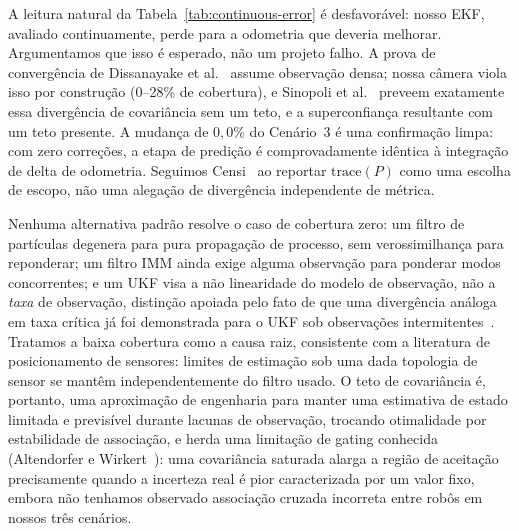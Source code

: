 \documentclass[runningheads]{llncs}
\renewcommand{\paragraph}[1]{\vspace{4pt}\noindent{\em #1}\enspace}
\begin{document}
\paragraph{Discussão.}
\label{sec:discussion}
A leitura natural da Tabela~\ref{tab:continuous-error} é desfavorável:
nosso EKF, avaliado continuamente, perde para a odometria que deveria
melhorar. Argumentamos que isso é esperado, não um projeto falho. A
prova de convergência de Dissanayake et
al.~\cite{dissanayake2001slam} assume observação densa; nossa câmera
viola isso por construção (0--28\% de cobertura), e Sinopoli et
al.~\cite{sinopoli2004intermittent} preveem exatamente essa divergência
de covariância sem um teto, e a superconfiança resultante com um teto
presente. A mudança de $0,0\%$ do Cenário~3 é uma confirmação limpa:
com zero correções, a etapa de predição é comprovadamente idêntica à
integração de delta de odometria. Seguimos
Censi~\cite{censi2009geometric} ao reportar $\mathrm{trace}(P)$ como
uma escolha de escopo, não uma alegação de divergência independente de
métrica.

Nenhuma alternativa padrão resolve o caso de cobertura zero: um filtro
de partículas degenera para pura propagação de processo, sem
verossimilhança para reponderar; um filtro IMM ainda exige alguma
observação para ponderar modos concorrentes; e um UKF visa a não
linearidade do modelo de observação, não a \emph{taxa} de observação,
distinção apoiada pelo fato de que uma divergência análoga em taxa
crítica já foi demonstrada para o UKF sob observações
intermitentes~\cite{li2012ukf}. Tratamos a baixa cobertura como a
causa raiz, consistente com a literatura de posicionamento de
sensores: limites de estimação sob uma dada topologia de sensor se
mantêm independentemente do filtro usado. O teto de covariância é,
portanto, uma aproximação de engenharia para manter uma estimativa de
estado limitada e previsível durante lacunas de observação, trocando
otimalidade por estabilidade de associação, e herda uma limitação de
gating conhecida (Altendorfer e
Wirkert~\cite{altendorfer2016association}): uma covariância saturada
alarga a região de aceitação precisamente quando a incerteza real é
pior caracterizada por um valor fixo, embora não tenhamos observado
associação cruzada incorreta entre robôs em nossos três cenários.
\end{document}
